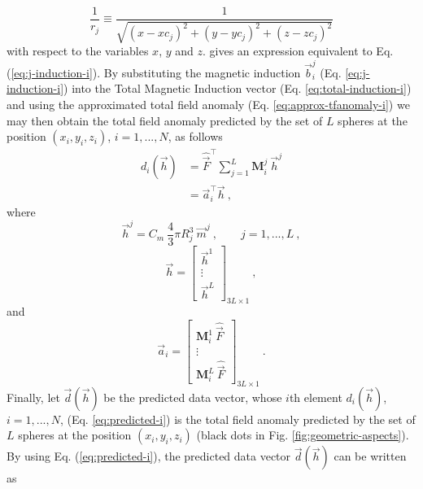 \documentclass[journal abbreviation, npg]{copernicus}
\begin{document}
\begin{equation}
\dfrac{1}{r_{j}} \equiv 
\dfrac{1}{\sqrt{(x - xc_{j})^{2} + 
				(y - yc_{j})^{2} +
				(z - zc_{j})^{2}}}
\label{eq:1/rj}
\end{equation}
with respect to the variables $x$, $y$ and $z$. \citet{blakely1996} gives an expression equivalent to Eq. (\ref{eq:j-induction-i}). By substituting the magnetic induction $\vec{b}^{j}_{i}$ (Eq. \ref{eq:j-induction-i}) into the Total Magnetic Induction vector (Eq. \ref{eq:total-induction-i}) and using the approximated total field anomaly (Eq. \ref{eq:approx-tfanomaly-i}) we may then obtain the total field anomaly predicted by the set of $L$ spheres at the position $(x_{i}, y_{i}, z_{i})$, $i = 1, ..., N$, as follows
\begin{equation}
\begin{array}{cl}
d_{i}(\vec{h}) & 
= \hat{\vec{F}}^{\intercal} \sum_{j = 1}^{L} \mathbf{M}_{i}^{j} \: \vec{h}^{j} \\
&
= \vec{a}_{i}^{\intercal} \vec{h} \: ,
\end{array}
\label{eq:predicted-i}
\end{equation}
where
\begin{equation}
\vec{h}^{j} = C_{m} \: \dfrac{4}{3} \pi R_{j}^{3} \: \vec{m}^{j} \: ,
\qquad j = 1, ..., L \: ,
\label{eq:hj}
\end{equation}
\begin{equation}
\vec{h} = 
\left[
\begin{array}{c}
\vec{h}^{1} \\
\vdots \\
\vec{h}^{L}
\end{array}
\right]_{3L \times 1} \: ,
\label{eq:h}
\end{equation}
and
\begin{equation}
\vec{a}_{i} = 
\left[
\begin{array}{c}
\mathbf{M}_{i}^{1} \: \hat{\vec{F}} \\
\vdots \\
\mathbf{M}_{i}^{L} \: \hat{\vec{F}}
\end{array}
\right]_{3L \times 1} \: .
\label{eq:ai}
\end{equation}
Finally, let $\vec{d}(\vec{h})$ be the predicted data vector, whose $i$th element $d_{i}(\vec{h})$, $i = 1, ..., N$, (Eq. \ref{eq:predicted-i}) is the total field anomaly predicted by the set of $L$ spheres at the position $(x_{i}, y_{i}, z_{i})$ (black dots in Fig. \ref{fig:geometric-aspects}). By using Eq. (\ref{eq:predicted-i}), the predicted data vector $\vec{d}(\vec{h})$ can be written as
\end{document}
